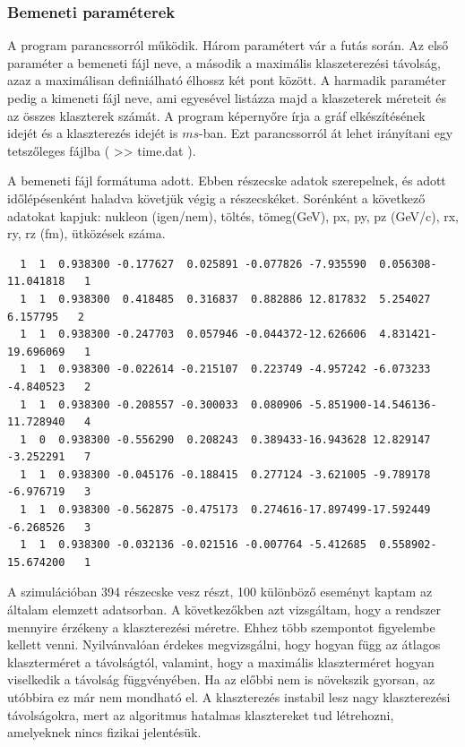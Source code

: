 \documentclass[a4paper,12pt]{article}
\begin{document}
\subsubsection{ Bemeneti paraméterek}
\par A program parancssorról működik.  Három paramétert vár a futás során. Az első paraméter a bemeneti fájl neve, a második a maximális 
klaszeterezési távolság, azaz a maximálisan definiálható élhossz két pont között. A harmadik paraméter pedig a kimeneti fájl neve, ami
egyesével listázza majd a klaszeterek méreteit és az összes klaszterek számát. A program képernyőre írja a gráf elkészítésének idejét
és a klaszterezés idejét is $ms$-ban. Ezt parancssorról át lehet irányítani egy tetszőleges fájlba ( >> time.dat ).
\par A bemeneti fájl formátuma adott. Ebben részecske adatok szerepelnek, és adott időlépésenként haladva követjük végig a részecskéket.
Sorénként a következő adatokat kapjuk: nukleon (igen/nem), töltés, tömeg(GeV), px, py, pz (GeV/c), rx, ry, rz (fm), ütközések száma.
\begin{lstlisting}
  1  1  0.938300 -0.177627  0.025891 -0.077826 -7.935590  0.056308-11.041818   1
  1  1  0.938300  0.418485  0.316837  0.882886 12.817832  5.254027  6.157795   2
  1  1  0.938300 -0.247703  0.057946 -0.044372-12.626606  4.831421-19.696069   1
  1  1  0.938300 -0.022614 -0.215107  0.223749 -4.957242 -6.073233 -4.840523   2
  1  1  0.938300 -0.208557 -0.300033  0.080906 -5.851900-14.546136-11.728940   4
  1  0  0.938300 -0.556290  0.208243  0.389433-16.943628 12.829147 -3.252291   7
  1  1  0.938300 -0.045176 -0.188415  0.277124 -3.621005 -9.789178 -6.976719   3
  1  1  0.938300 -0.562875 -0.475173  0.274616-17.897499-17.592449 -6.268526   3
  1  1  0.938300 -0.032136 -0.021516 -0.007764 -5.412685  0.558902-15.674200   1
\end{lstlisting}
\par A szimulációban 394 részecske vesz részt, 100 különböző eseményt kaptam az általam elemzett adatsorban.
A következőkben azt vizsgáltam, hogy a rendszer mennyire érzékeny a klaszterezési méretre. Ehhez több szempontot figyelembe
kellett venni. Nyilvánvalóan érdekes megvizsgálni, hogy hogyan függ az átlagos klaszterméret a távolságtól, valamint, hogy a maximális 
klaszterméret hogyan viselkedik a távolság függvényében. Ha az előbbi nem is növekszik gyorsan, az utóbbira ez már nem mondható el. 
A klaszterezés instabil lesz nagy klaszterezési távolságokra, mert az algoritmus hatalmas klasztereket tud létrehozni, amelyeknek nincs
fizikai jelentésük. 
\end{document}
